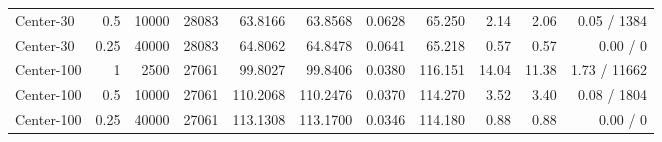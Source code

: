 \begin{table}[!tbp]
\begin{tabular}{lrrrrrrrrrr}
Center-30 & 0.5 & 10000 & 28083 & 63.8166 & 63.8568 & 0.0628 & 65.250 & 2.14 & 2.06 & 0.05 / 1384\\
Center-30 & 0.25 & 40000 & 28083 & 64.8062 & 64.8478 & 0.0641 & 65.218 & 0.57 & 0.57 & 0.00 / 0\\
\addlinespace[2pt]
Center-100 & 1 & 2500 & 27061 & 99.8027 & 99.8406 & 0.0380 & 116.151 & 14.04 & 11.38 & 1.73 / 11662\\
Center-100 & 0.5 & 10000 & 27061 & 110.2068 & 110.2476 & 0.0370 & 114.270 & 3.52 & 3.40 & 0.08 / 1804\\
Center-100 & 0.25 & 40000 & 27061 & 113.1308 & 113.1700 & 0.0346 & 114.180 & 0.88 & 0.88 & 0.00 / 0\\
\bottomrule
\end{tabular}
\end{table}
